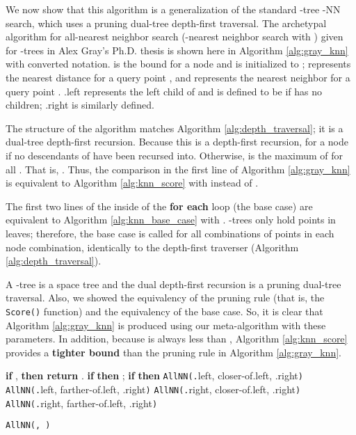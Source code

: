 \documentclass{article}
\begin{document}
We now show that this algorithm is a generalization of the standard
-tree -NN search, which uses a pruning dual-tree depth-first traversal.
The archetypal algorithm for all-nearest neighbor search (-nearest neighbor
search with ) given for -trees in Alex Gray's Ph.D. thesis
 is shown here in Algorithm \ref{alg:gray_knn} with
converted notation.   is the bound for a node  and
is initialized to ;  represents the nearest distance for a
query point , and  represents the nearest neighbor for a query
point .  .left represents the left child of 
and is defined to be  if  has no children;
.right is similarly defined.

The structure of the algorithm matches Algorithm \ref{alg:depth_traversal}; it
is a dual-tree depth-first recursion.  Because this is a depth-first recursion,
 for a node  if no descendants of
 have been recursed into.  Otherwise,  is the
maximum of  for all .  That is, .  Thus, the comparison in the first line of Algorithm
\ref{alg:gray_knn} is equivalent to Algorithm \ref{alg:knn_score} with
 instead of .


The first two lines of the inside of the \textbf{for each} loop (the base case)
are equivalent to Algorithm \ref{alg:knn_base_case} with .  -trees
only hold points in leaves; therefore, the base case is called for all
combinations of points in each node combination, identically to the depth-first
traverser (Algorithm \ref{alg:depth_traversal}).

A -tree is a space tree and the dual depth-first recursion is a pruning
dual-tree traversal.  Also, we showed the equivalency of the pruning rule (that
is, the \texttt{Score()} function) and the equivalency of the base case.  So, it
is clear that Algorithm \ref{alg:gray_knn} is produced using our meta-algorithm
with these parameters.  In addition, because  is always less
than , Algorithm \ref{alg:knn_score} provides a {\bf tighter
bound} than the pruning rule in Algorithm \ref{alg:gray_knn}.

\begin{algorithm}[tb]
  \begin{algorithmic}
    \STATE \textbf{if} , \textbf{then return}
      \FORALL{}
        \STATE .
        \STATE \textbf{if}  \textbf{then} ; 
        \STATE \textbf{if}  \textbf{then} 
      \ENDFOR
    \ENDIF
    \STATE \texttt{AllNN(.}left, closer-of.left,
.right\texttt{)}
    \STATE \texttt{AllNN(.}left, farther-of.left,
.right\texttt{)}
    \STATE \texttt{AllNN(.}right, closer-of.left,
.right\texttt{)}
    \STATE \texttt{AllNN(.}right, farther-of.left, .right\texttt{)}
    \STATE 
  \end{algorithmic}

  \caption{\texttt{AllNN(, )} \cite{gray2003phd}}
  \label{alg:gray_knn}
\end{algorithm}
\end{document}
